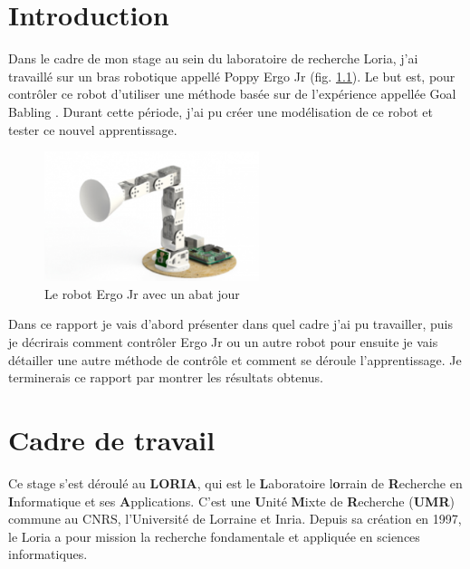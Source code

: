 \documentclass[11pt,french]{report}
\begin{document}
\chapter{Introduction}

Dans le cadre de mon stage au sein du laboratoire de recherche Loria, j'ai travaillé sur un bras robotique appellé Poppy Ergo Jr \cite{PoppyErgoJr} (fig. \ref{fig:ErgoJr}).
Le but est, pour contrôler ce robot d'utiliser une méthode basée sur de l'expérience appellée Goal Babling \cite{GoalBabling}.
Durant cette période, j'ai pu créer une modélisation de ce robot et tester ce nouvel apprentissage.

\phantom{INVISIBLE LINE}

\begin{figure}
    \centering
    \includegraphics[width=178pt]{Ergo_Jr_abat_jour} 
    \caption{Le robot Ergo Jr avec un abat jour}
    \label{fig:ErgoJr}
\end{figure}

Dans ce rapport je vais d'abord présenter dans quel cadre j'ai pu travailler, puis je décrirais comment contrôler Ergo Jr ou un autre robot pour ensuite je vais détailler une autre méthode de contrôle et comment se déroule l'apprentissage.
Je terminerais ce rapport par montrer les résultats obtenus.

\chapter{Cadre de travail}

Ce stage s'est déroulé au \textbf{LORIA}, qui est le \textbf{L}aboratoire l\textbf{o}rrain de \textbf{R}echerche en \textbf{I}nformatique et ses \textbf{A}pplications.
C'est une \textbf{U}nité \textbf{M}ixte de \textbf{R}echerche (\textbf{UMR}) commune au CNRS, l'Université de Lorraine et Inria.
Depuis sa création en 1997, le Loria a pour mission la recherche fondamentale et appliquée en sciences informatiques.
\end{document}
